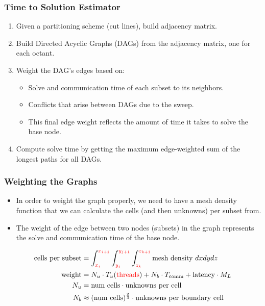 \documentclass[xcolor={usenames,dvipsnames,svgnames,table}]{beamer}
\newcommand{\tcr}[1]{\textcolor{red}{#1}}
\begin{document}
\begin{frame}[t]\frametitle{Time to Solution Estimator}
\begin{block}{}
\begin{enumerate}
	\item Given a partitioning scheme (cut lines), build adjacency matrix.
	\item Build Directed Acyclic Graphs (DAGs) from the adjacency matrix, one for each octant.
	\item Weight the DAG's edges based on:
	\begin{itemize}
		\item Solve and communication time of each subset to its neighbors.
		\item Conflicts that arise between DAGs due to the sweep.
		\item This final edge weight reflects the amount of time it takes to solve the base node.
	\end{itemize}
	\item Compute solve time by getting the maximum edge-weighted sum of the longest paths for all DAGs.
\end{enumerate}
\end{block}
\end{frame}

\begin{frame}[t]\frametitle{Weighting the Graphs}
\begin{block}{}
\begin{itemize}
	\item In order to weight the graph properly, we need to have a mesh density function that we can calculate the cells (and then unknowns) per subset from.
	\item The weight of the edge between two nodes (subsets) in the graph represents the solve and communication time of the base node.
\end{itemize}
\end{block}
\begin{block}{}
\begin{align}
\text{cells per subset} &= \int_{\tcr{x_i}}^{\tcr{x_{i+1}}} \int_{\tcr{y_j}}^{\tcr{y_{j+1}}} \int_{\tcr{z_k}}^{\tcr{z_{k+1}}} \text{mesh density } dx dy dz \\
\label{weight}
\text{weight} &= N_u\cdot T_u (\text{\textcolor{red}{threads}}) + N_b\cdot T_{\text{comm}} + \text{latency}\cdot M_L \\
N_u &= \text{num cells}\cdot \text{unknowns per cell} \\
N_b &\approx(\text{num cells})^{\frac{2}{3}}\cdot \text{unknowns per boundary cell}
\end{align}
\end{block}
\end{frame}
\end{document}
